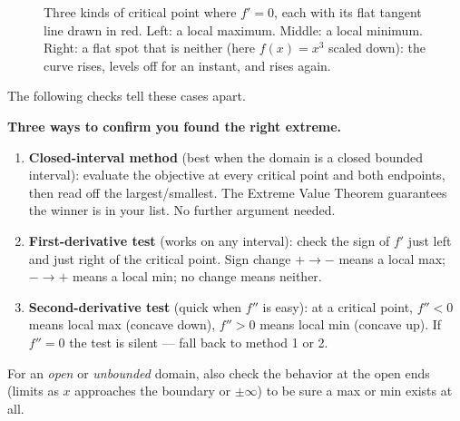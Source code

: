 \begin{figure}[htbp]
\centering
{}
\caption{Three kinds of critical point where $f'=0$, each with its flat tangent line
drawn in red. Left: a local maximum. Middle: a local minimum. Right: a flat spot
that is neither (here $f(x)=x^3$ scaled down): the curve rises, levels off for an
instant, and rises again.}
\label{ch17:fig-crit-types}
\end{figure}

The following checks tell these cases apart.

\begin{focusbox}
\textbf{Three ways to confirm you found the right extreme.}
\begin{enumerate}
  \item \textbf{Closed-interval method} (best when the domain is a closed bounded
    interval): evaluate the objective at every critical point and both endpoints,
    then read off the largest/smallest. The Extreme Value Theorem guarantees the
    winner is in your list. No further argument needed.
  \item \textbf{First-derivative test} (works on any interval): check the sign of
    $f'$ just left and just right of the critical point. Sign change $+\to-$ means a
    local max; $-\to+$ means a local min; no change means neither.
  \item \textbf{Second-derivative test} (quick when $f''$ is easy): at a critical
    point, $f''<0$ means local max (concave down), $f''>0$ means local min (concave
    up). If $f''=0$ the test is silent --- fall back to method 1 or 2.
\end{enumerate}
For an \emph{open} or \emph{unbounded} domain, also check the behavior at the open
ends (limits as $x$ approaches the boundary or $\pm\infty$) to be sure a max or min
exists at all.
\end{focusbox}

